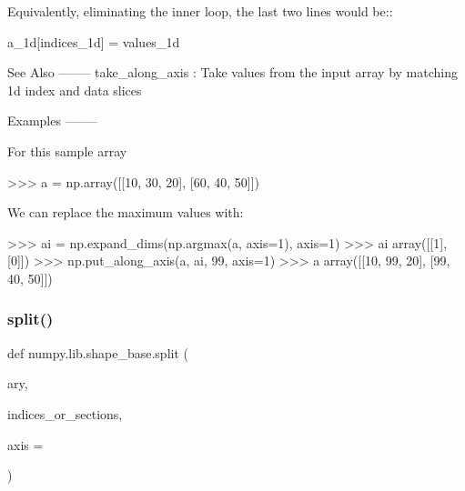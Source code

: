 \begin{DoxyVerb}
Equivalently, eliminating the inner loop, the last two lines would be::

            a_1d[indices_1d] = values_1d

See Also
--------
take_along_axis :
    Take values from the input array by matching 1d index and data slices

Examples
--------

For this sample array

>>> a = np.array([[10, 30, 20], [60, 40, 50]])

We can replace the maximum values with:

>>> ai = np.expand_dims(np.argmax(a, axis=1), axis=1)
>>> ai
array([[1],
       [0]])
>>> np.put_along_axis(a, ai, 99, axis=1)
>>> a
array([[10, 99, 20],
       [99, 40, 50]])\end{DoxyVerb}
 \mbox{\label{namespacenumpy_1_1lib_1_1shape__base_add2346abe66e81efc9bc958f18abf3d9}} 
\subsubsection{\texorpdfstring{split()}{split()}}
{\footnotesize\ttfamily def numpy.\+lib.\+shape\+\_\+base.\+split (\begin{DoxyParamCaption}\item[{}]{ary,  }\item[{}]{indices\+\_\+or\+\_\+sections,  }\item[{}]{axis = {} }\end{DoxyParamCaption})}

